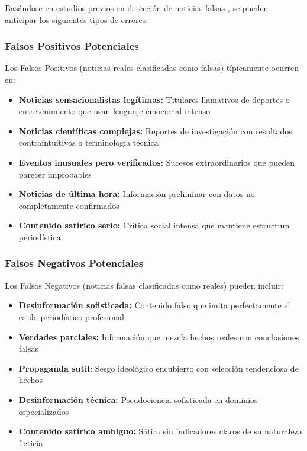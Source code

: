Basándose en estudios previos en detección de noticias falsas \cite{posadas2019detection, blanco2024enhancing}, se pueden anticipar los siguientes tipos de errores:

\subsubsection{Falsos Positivos Potenciales}

Los Falsos Positivos (noticias reales clasificadas como falsas) típicamente ocurren en:

\begin{itemize}
    \item \textbf{Noticias sensacionalistas legítimas:} Titulares llamativos de deportes o entretenimiento que usan lenguaje emocional intenso
    \item \textbf{Noticias científicas complejas:} Reportes de investigación con resultados contraintuitivos o terminología técnica
    \item \textbf{Eventos inusuales pero verificados:} Sucesos extraordinarios que pueden parecer improbables
    \item \textbf{Noticias de última hora:} Información preliminar con datos no completamente confirmados
    \item \textbf{Contenido satírico serio:} Crítica social intensa que mantiene estructura periodística
\end{itemize}

\subsubsection{Falsos Negativos Potenciales}

Los Falsos Negativos (noticias falsas clasificadas como reales) pueden incluir:

\begin{itemize}
    \item \textbf{Desinformación sofisticada:} Contenido falso que imita perfectamente el estilo periodístico profesional
    \item \textbf{Verdades parciales:} Información que mezcla hechos reales con conclusiones falsas
    \item \textbf{Propaganda sutil:} Sesgo ideológico encubierto con selección tendenciosa de hechos
    \item \textbf{Desinformación técnica:} Pseudociencia sofisticada en dominios especializados
    \item \textbf{Contenido satírico ambiguo:} Sátira sin indicadores claros de su naturaleza ficticia
\end{itemize}

